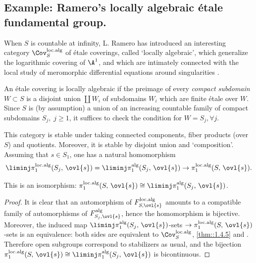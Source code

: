 \subsection{Example: Ramero's locally algebraic \'etale fundamental
group.}\label{sub::1.5}

\begin{para}\label{para::1.5.1}
 When $S$ is countable at infinity, L. Ramero has introduced an
 interesting category $\Cov^{\mathrm{loc.alg}}_S$ of \'etale coverings, called
 `locally algebraic', which generalize the logarithmic covering of
 $\A^1$, and which are intimately connected with the local study of
 meromorphic differential equations around singularities \cite[4]{ramero98}.

 An \'etale covering is locally algebraic if the preimage of every {\it
 compact subdomain} $W\subset S$ is a disjoint union $\coprod W_i$ of
 subdomains $W_i$ which are finite \'etale over $W$. Since $S$ is (by
 assumption) a union of an increasing countable family of compact
 subdomains $S_j,\; j\geq 1$, it suffices to check the condition for 
 $W=S_j,\forall j.$ 

 \noindent This category is stable under taking connected components,
 fiber products (over $S$) and quotients. Moreover, it is stable by
 disjoint union and `composition'. Assuming that
 $s\in S_1$, one has a natural homomorphism  
 \begin{equation*}
 \liminj\pi_1^{\mathrm{loc.alg}}(S_j,\,\ovl{s}) = \liminj
  \pi_1^{\mathrm{alg}}(S_j,\,\ovl{s})\to \pi_1^{\mathrm{loc.alg}}(S,\,\ovl{s}).
 \end{equation*}
\end{para}

\begin{pro}\label{pro::1.5.2} This is an isomorphism:
 $\pi_1^{\mathrm{loc.alg}}(S,\,\ovl{s})\cong \liminj
 \pi_1^{\mathrm{alg}}(S_j,\,\ovl{s})$.
\end{pro}
   
\begin{proof}
 It is clear that an automorphism of $F^{\mathrm{loc.alg}}_{S,\ovl{s}}$
 amounts to a compatible family of automorphisms of
 $F^{\mathrm{alg}}_{S_j,\ovl{s}}$, hence the homomorphism is
 bijective. Moreover, the induced map $ \liminj
 \pi_1^{\mathrm{alg}}(S_j,\,\ovl{s})$-sets $\to
 \pi_1^{\mathrm{loc.alg}}(S,\,\ovl{s})$-sets is an equivalence: both
 sides are equivalent to $\Cov^{\mathrm{loc.alg}}_S$, \cf \ref{thm::1.4.5} and
 \cite[4.1.6]{ramero98}. Therefore open subgroups correspond to stabilizers as
 usual, and the bijection $\pi_1^{\mathrm{loc.alg}}(S,\,\ovl{s})\cong
 \liminj \pi_1^{\mathrm{alg}}(S_j,\,\ovl{s})$ is bicontinuous.
\end{proof}

